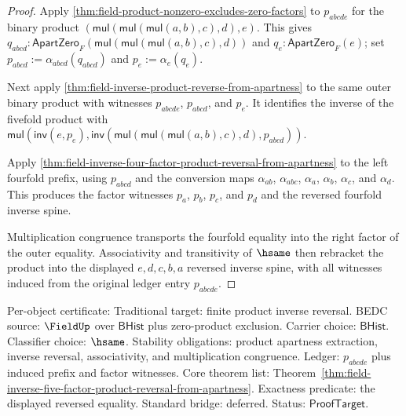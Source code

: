 \begin{proof}
Apply \autoref{thm:field-product-nonzero-excludes-zero-factors} to
$p_{abcde}$ for the binary product
$(\mathsf{mul}(\mathsf{mul}(\mathsf{mul}(a,b),c),d),e)$. This gives
$q_{abcd}:
\mathsf{ApartZero}_F(\mathsf{mul}(\mathsf{mul}(\mathsf{mul}(a,b),c),d))$
and $q_e:\mathsf{ApartZero}_F(e)$; set
$p_{abcd}:=\alpha_{abcd}(q_{abcd})$ and $p_e:=\alpha_e(q_e)$.

Next apply \autoref{thm:field-inverse-product-reverse-from-apartness} to the
same outer binary product with witnesses $p_{abcde}$, $p_{abcd}$, and $p_e$.
It identifies the inverse of the fivefold product with
$\mathsf{mul}(\mathsf{inv}(e,p_e),
\mathsf{inv}(\mathsf{mul}(\mathsf{mul}(\mathsf{mul}(a,b),c),d),p_{abcd}))$.

Apply \autoref{thm:field-inverse-four-factor-product-reversal-from-apartness}
to the left fourfold prefix, using $p_{abcd}$ and the conversion maps
$\alpha_{ab}$, $\alpha_{abc}$, $\alpha_a$, $\alpha_b$, $\alpha_c$, and
$\alpha_d$. This produces the factor witnesses $p_a$, $p_b$, $p_c$, and
$p_d$ and the reversed fourfold inverse spine.

Multiplication congruence transports the fourfold equality into the right
factor of the outer equality. Associativity and transitivity of $\hsame$ then
rebracket the product into the displayed $e,d,c,b,a$ reversed inverse spine,
with all witnesses induced from the original ledger entry $p_{abcde}$.
\end{proof}

Per-object certificate: Traditional target: finite product inverse reversal.
BEDC source: $\FieldUp$ over $\mathsf{BHist}$ plus zero-product exclusion.
Carrier choice: $\mathsf{BHist}$. Classifier choice: $\hsame$. Stability
obligations: product apartness extraction, inverse reversal, associativity,
and multiplication congruence. Ledger: $p_{abcde}$ plus induced prefix and
factor witnesses. Core theorem list:
Theorem~\ref{thm:field-inverse-five-factor-product-reversal-from-apartness}.
Exactness predicate: the displayed reversed equality. Standard bridge:
deferred. Status: $\mathsf{ProofTarget}$.
